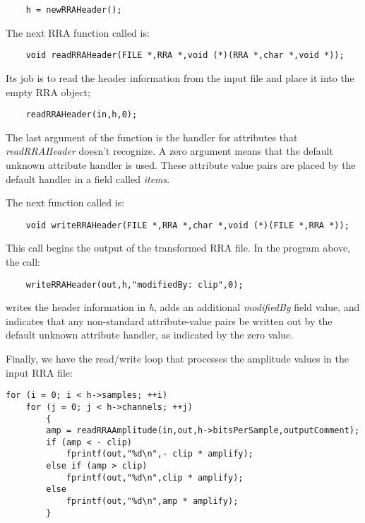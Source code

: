 \documentclass{article}
\begin{document}
\begin{verbatim}
    h = newRRAHeader();
\end{verbatim}

The next RRA function called is:

\begin{verbatim}
    void readRRAHeader(FILE *,RRA *,void (*)(RRA *,char *,void *));
\end{verbatim}

Its job is to read the header information from the input file and
place it into the empty RRA object;

\begin{verbatim}
    readRRAHeader(in,h,0);
\end{verbatim}

The last argument of the function is the handler for attributes that
{\it readRRAHeader} doesn't recognize. A zero argument means that the default
unknown attribute handler is used. These attribute value pairs are placed
by the default handler
in a field called {\it items}.

The next function called is:

\begin{verbatim}
    void writeRRAHeader(FILE *,RRA *,char *,void (*)(FILE *,RRA *));
\end{verbatim}

This call begins the output of the transformed RRA file. In the program
above, the call:
    
\begin{verbatim}
    writeRRAHeader(out,h,"modifiedBy: clip",0);
\end{verbatim}

writes the header information in {\it h},
adds an additional {\it modifiedBy} field value,
and indicates that any non-standard attribute-value pairs
be written out by the default
unknown attribute handler, as indicated by the zero value.

Finally, we have
the read/write loop that processes the amplitude values in the input
RRA file:

\begin{verbatim}
for (i = 0; i < h->samples; ++i)
    for (j = 0; j < h->channels; ++j)
        {
        amp = readRRAAmplitude(in,out,h->bitsPerSample,outputComment);
        if (amp < - clip)
            fprintf(out,"%d\n",- clip * amplify);
        else if (amp > clip)
            fprintf(out,"%d\n",clip * amplify);
        else
            fprintf(out,"%d\n",amp * amplify);
        }
\end{verbatim}
\end{document}
